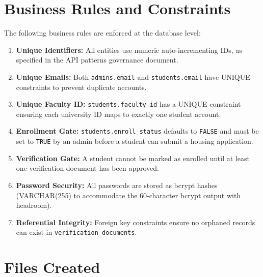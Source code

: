 \documentclass[12pt,a4paper]{article}
\begin{document}
\section{Business Rules and Constraints}

The following business rules are enforced at the database level:

\begin{enumerate}
    \item \textbf{Unique Identifiers:} All entities use numeric auto-incrementing IDs, as specified in the API patterns governance document.
    \item \textbf{Unique Emails:} Both \texttt{admins.email} and \texttt{students.email} have UNIQUE constraints to prevent duplicate accounts.
    \item \textbf{Unique Faculty ID:} \texttt{students.faculty\_id} has a UNIQUE constraint ensuring each university ID maps to exactly one student account.
    \item \textbf{Enrollment Gate:} \texttt{students.enroll\_status} defaults to \texttt{FALSE} and must be set to \texttt{TRUE} by an admin before a student can submit a housing application.
    \item \textbf{Verification Gate:} A student cannot be marked as enrolled until at least one verification document has been approved.
    \item \textbf{Password Security:} All passwords are stored as bcrypt hashes (VARCHAR(255) to accommodate the 60-character bcrypt output with headroom).
    \item \textbf{Referential Integrity:} Foreign key constraints ensure no orphaned records can exist in \texttt{verification\_documents}.
\end{enumerate}

\section{Files Created}
\end{document}

